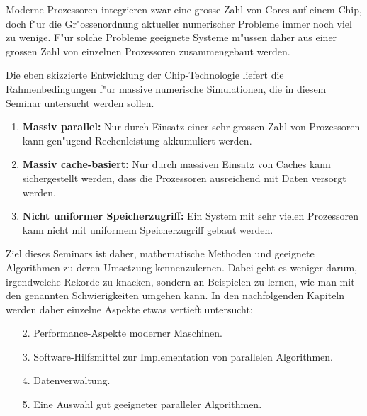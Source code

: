 Moderne Prozessoren integrieren zwar eine grosse Zahl von Cores auf
einem Chip, doch f"ur die Gr"ossenordnung aktueller numerischer
Probleme immer noch viel zu wenige. F"ur solche Probleme geeignete
Systeme m"ussen daher aus einer grossen Zahl von einzelnen Prozessoren
zusammengebaut werden. 

Die eben skizzierte Entwicklung der Chip-Technologie liefert die
Rahmenbedingungen f"ur massive numerische Simulationen, die in diesem
Seminar untersucht werden sollen.
\begin{enumerate}
\item {\bf Massiv parallel:} Nur durch Einsatz einer sehr grossen Zahl
von Prozessoren kann gen"ugend Rechenleistung akkumuliert werden.
\item {\bf Massiv cache-basiert:} Nur durch massiven Einsatz von
Caches kann sichergestellt werden, dass die Prozessoren ausreichend
mit Daten versorgt werden.
\item {\bf Nicht uniformer Speicherzugriff:} Ein System mit
sehr vielen Prozessoren kann nicht mit uniformem Speicherzugriff gebaut
werden.
\end{enumerate}
Ziel dieses Seminars ist daher, mathematische Methoden und geeignete
Algorithmen zu deren Umsetzung kennenzulernen. Dabei geht es weniger
darum, irgendwelche Rekorde zu knacken, sondern an Beispielen zu
lernen, wie man mit den genannten Schwierigkeiten umgehen kann.
In den nachfolgenden Kapiteln werden daher einzelne Aspekte etwas
vertieft untersucht:
\begin{enumerate}
\item[2.] Performance-Aspekte moderner Maschinen.
\item[3.] Software-Hilfsmittel zur Implementation von parallelen Algorithmen.
\item[4.] Datenverwaltung.
\item[5.] Eine Auswahl gut geeigneter paralleler Algorithmen.
\end{enumerate}

